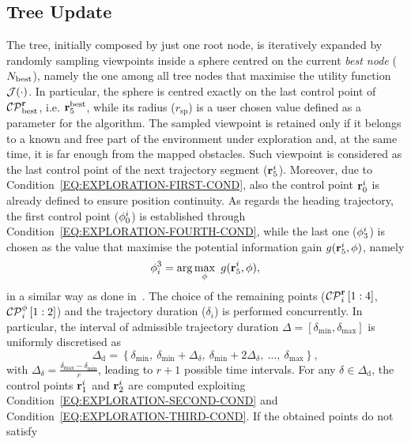 \subsection{Tree Update}%
\label{SEC:EXPLORATION-TREE-UPDATE}
The tree, initially composed by just one root node, is iteratively expanded by randomly sampling viewpoints inside a sphere centred on
the current \emph{best node} ($N_{\text{best}}$), namely the one among all tree nodes that maximise the utility function $\mathcal{J}(\cdot)$.
In particular, the sphere is centred exactly on the last control point of $\mathcal{CP}^{\mathbf{r}}_{\text{best}}$, i.e. $\mathbf{r}^{\text{best}}_5$, while
its radius ($r_{\text{sp}}$) is a user chosen value defined as a parameter for the algorithm. The sampled viewpoint is retained only if
it belongs to a known and free part of the environment under exploration and, at the same time, it is far enough from the mapped obstacles.
Such viewpoint is considered as the last control point of the next trajectory segment ($\mathbf{r}^{i}_5$). Moreover, due to
Condition~\eqref{EQ:EXPLORATION-FIRST-COND}, also the control point $\mathbf{r}^{i}_0$ is already defined to ensure position continuity.
As regards the heading trajectory, the first control point ($\phi^i_0$) is established through Condition~\eqref{EQ:EXPLORATION-FOURTH-COND},
while the last one ($\phi^i_3$) is chosen as the value that maximise the potential information gain $g(\mathbf{r}_5^i, \phi)$, namely
\begin{equation*}
	\phi_i^3 = \arg \max_{\phi} \ g(\mathbf{r}_5^i, \phi),
\end{equation*}
in a similar way as done in~\cite{selin2019efficient}. The choice of the remaining points ($\mathcal{CP}^{\mathbf{r}}_i\left[ 1:4 \right]$,
$\mathcal{CP}^{\phi}_i \left[ 1:2 \right]$) and the trajectory duration ($\delta_i$) is performed concurrently. In particular, the interval of
admissible trajectory duration $\Delta = [\delta_{\text{min}}, \delta_{\text{max}}]$ is uniformly discretised as
\begin{equation*}
	\Delta_{\text{d}} = \left\{ \delta_{\text{min}},\  \delta_{\text{min}} + \Delta_{\delta}, \  \delta_{\text{min}} + 2\Delta_{\delta},\  \dots, \ \delta_{\text{max}} \right\},
\end{equation*}
with $\Delta_{\delta} = \frac{\delta_{\text{max}} - \delta_{\text{min}}}{r}$, leading to $r+1$ possible time intervals.
For any $\delta \in \Delta_{\text{d}}$, the control points $\mathbf{r}^{i}_1$ and $\mathbf{r}^{i}_2$ are computed exploiting Condition~\eqref{EQ:EXPLORATION-SECOND-COND}
and Condition~\eqref{EQ:EXPLORATION-THIRD-COND}. If the obtained points do not satisfy~
